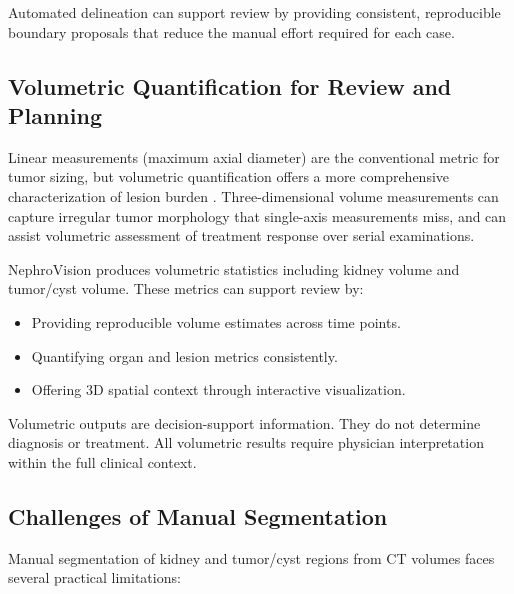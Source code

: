 Automated delineation can support review by providing consistent, reproducible boundary proposals that reduce the manual effort required for each case.

\subsection{Volumetric Quantification for Review and Planning}

Linear measurements (maximum axial diameter) are the conventional metric for tumor sizing, but volumetric quantification offers a more comprehensive characterization of lesion burden \cite{tumor_volumetry}. Three-dimensional volume measurements can capture irregular tumor morphology that single-axis measurements miss, and can assist volumetric assessment of treatment response over serial examinations.

NephroVision produces volumetric statistics including kidney volume and tumor/cyst volume. These metrics can support review by:
\begin{itemize}
    \item Providing reproducible volume estimates across time points.
    \item Quantifying organ and lesion metrics consistently.
    \item Offering 3D spatial context through interactive visualization.
\end{itemize}

Volumetric outputs are decision-support information. They do not determine diagnosis or treatment. All volumetric results require physician interpretation within the full clinical context.

\subsection{Challenges of Manual Segmentation}

Manual segmentation of kidney and tumor/cyst regions from CT volumes faces several practical limitations:

